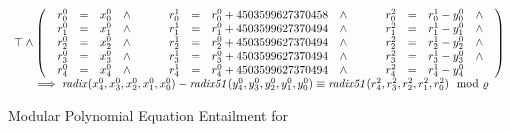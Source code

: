 \begin{figure}
  \centering
  \[
  \begin{array}{l}
  \top \wedge
  \left(
  \begin{array}{lclcl}
    \begin{array}{rclc}
      {r}^0_0 & = & {x}^0_0 & \wedge \\
      {r}^0_1 & = & {x}^0_1 & \wedge \\
      {r}^0_2 & = & {x}^0_2 & \wedge \\
      {r}^0_3 & = & {x}^0_3 & \wedge \\
      {r}^0_4 & = & {x}^0_4 & \wedge \\
    \end{array}
    &\hspace{.01\textwidth}&
    \begin{array}{rclc}
      {r}^1_0 & = & {r}^0_0 + {4503599627370458} & \wedge \\
      {r}^1_1 & = & {r}^0_1 + {4503599627370494} & \wedge \\
      {r}^1_2 & = & {r}^0_2 + {4503599627370494} & \wedge \\
      {r}^1_3 & = & {r}^0_3 + {4503599627370494} & \wedge \\
      {r}^1_4 & = & {r}^0_4 + {4503599627370494} & \wedge\\
    \end{array}
    &\hspace{.01\textwidth}&
    \begin{array}{rclc}
      {r}^2_0 & = & {r}^1_0 - {y}^0_0 & \wedge \\
      {r}^2_1 & = & {r}^1_1 - {y}^0_1 & \wedge \\
      {r}^2_2 & = & {r}^1_2 - {y}^0_2 & \wedge \\
      {r}^2_3 & = & {r}^1_3 - {y}^0_3 & \wedge \\
      {r}^2_4 & = & {r}^1_4 - {y}^0_4
    \end{array}
  \end{array}
  \right)\\
    \hspace{.05\textwidth}
    \implies 
    \mathit{radix}({x}^0_4, {x}^0_3, {x}^0_2, {x}^0_1, {x}^0_0) -
    \mathit{radix51}({y}^0_4, {y}^0_3, {y}^0_2, {y}^0_1, {y}^0_0)
    \equiv
    \mathit{radix51}({r}^2_4, {r}^2_3, {r}^2_2, {r}^2_1, {r}^2_0)
    \mod \myprime
  \end{array}
  \]
  \caption{Modular Polynomial Equation Entailment for }
  \label{figure:translation:subtraction-polynomial}
\end{figure}


